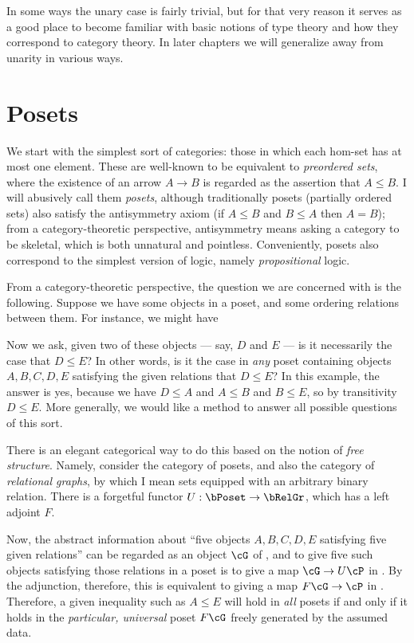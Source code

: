 \documentclass{book}
\begin{document}
In some ways the unary case is fairly trivial, but for that very reason it serves as a good place to become familiar with basic notions of type theory and how they correspond to category theory.
In later chapters we will generalize away from unarity in various ways.


\section{Posets}
\label{sec:poset}

We start with the simplest sort of categories: those in which each hom-set has at most one element.
These are well-known to be equivalent to \emph{preordered sets}, where the existence of an arrow $A\to B$ is regarded as the assertion that $A\le B$.
I will abusively call them \emph{posets}, although traditionally posets (partially ordered sets) also satisfy the antisymmetry axiom (if $A\le B$ and $B\le A$ then $A=B$); from a category-theoretic perspective, antisymmetry means asking a category to be skeletal, which is both unnatural and pointless.
Conveniently, posets also correspond to the simplest version of logic, namely \emph{propositional} logic.

From a category-theoretic perspective, the question we are concerned with is the following.
Suppose we have some objects in a poset, and some ordering relations between them.
For instance, we might have
Now we ask, given two of these objects --- say, $D$ and $E$ --- is it necessarily the case that $D\le E$?
In other words, is it the case in \emph{any} poset containing objects $A,B,C,D,E$ satisfying the given relations that $D\le E$?
In this example, the answer is yes, because we have $D\le A$ and  $A\le B$ and $B\le E$, so by transitivity $D\le E$.
More generally, we would like a method to answer all possible questions of this sort.

There is an elegant categorical way to do this based on the notion of \emph{free structure}.
Namely, consider the category \bPoset of posets, and also the category \bRelGr of \emph{relational graphs}, by which I mean sets equipped with an arbitrary binary relation.
There is a forgetful functor $U:\bPoset \to \bRelGr$, which has a left adjoint $F$.

Now, the abstract information about ``five objects $A,B,C,D,E$ satisfying five given relations'' can be regarded as an object $\cG$ of \bRelGr, and to give five such objects satisfying those relations in a poset \cP is to give a map $\cG \to U\cP$ in \bRelGr.
By the adjunction, therefore, this is equivalent to giving a map $F\cG \to \cP$ in \bPoset.
Therefore, a given inequality such as $A\le E$ will hold in \emph{all} posets if and only if it holds in the \emph{particular, universal} poset $F\cG$ freely generated by the assumed data.
\end{document}
